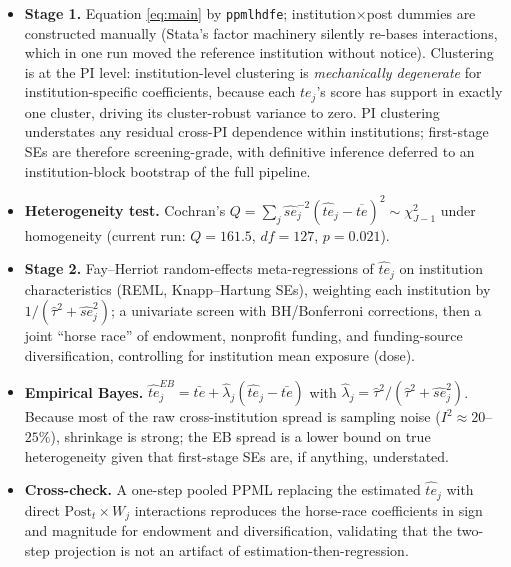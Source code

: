 \documentclass[11pt]{article}
\newcommand{\Post}{\mathrm{Post}}
\begin{document}
\begin{itemize}
\item \textbf{Stage 1.} Equation \eqref{eq:main} by \texttt{ppmlhdfe};
institution$\times$post dummies are constructed manually (Stata's factor
machinery silently re-bases interactions, which in one run moved the
reference institution without notice). Clustering is at the PI level:
institution-level clustering is \emph{mechanically degenerate} for
institution-specific coefficients, because each $te_j$'s score has support in
exactly one cluster, driving its cluster-robust variance to zero. PI
clustering understates any residual cross-PI dependence within institutions;
first-stage SEs are therefore screening-grade, with definitive inference
deferred to an institution-block bootstrap of the full pipeline.
\item \textbf{Heterogeneity test.} Cochran's $Q=\sum_j
\hat{se}_j^{-2}(\hat{te}_j - \overline{te})^2 \sim \chi^2_{J-1}$ under
homogeneity (current run: $Q=161.5$, $df=127$, $p=0.021$).
\item \textbf{Stage 2.} Fay--Herriot random-effects meta-regressions of
$\hat{te}_j$ on institution characteristics (REML, Knapp--Hartung SEs),
weighting each institution by $1/(\hat\tau^2 + \hat{se}_j^2)$; a univariate
screen with BH/Bonferroni corrections, then a joint ``horse race'' of
endowment, nonprofit funding, and funding-source diversification, controlling
for institution mean exposure (dose).
\item \textbf{Empirical Bayes.} $\hat{te}^{EB}_j = \bar{te} +
\hat\lambda_j(\hat{te}_j - \bar{te})$ with $\hat\lambda_j = \hat\tau^2 /
(\hat\tau^2 + \hat{se}_j^2)$. Because most of the raw cross-institution
spread is sampling noise ($I^2 \approx 20$--$25\%$), shrinkage is strong;
the EB spread is a lower bound on true heterogeneity given that first-stage
SEs are, if anything, understated.
\item \textbf{Cross-check.} A one-step pooled PPML replacing the estimated
$\hat{te}_j$ with direct $\Post_t \times W_j$ interactions reproduces the
horse-race coefficients in sign and magnitude for endowment and
diversification, validating that the two-step projection is not an artifact
of estimation-then-regression.
\end{itemize}
\end{document}
